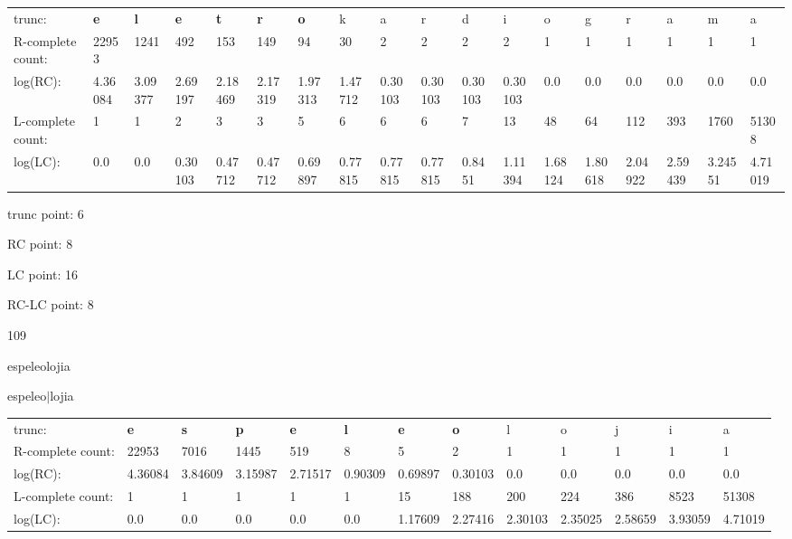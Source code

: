 \documentclass{article}
\begin{document}
\begin{tabular}{l|lllllllllllllllll}

trunc: & {\color{red}\bf e} & {\color{red}\bf l} & {\color{red}\bf e} & {\color{red}\bf t} & {\color{red}\bf r} & {\color{red}\bf o} & k & a & r & d & i & o & g & r & a & m & a \\ 
R-complete count: & 22953 & 1241 & 492 & 153 & 149 & 94 & 30 & 2 & 2 & 2 & 2 & 1 & 1 & 1 & 1 & 1 & 1 \\ 
log(RC): & 4.36084 & 3.09377 & 2.69197 & 2.18469 & 2.17319 & 1.97313 & 1.47712 & 0.30103 & 0.30103 & 0.30103 & 0.30103 & 0.0 & 0.0 & 0.0 & 0.0 & 0.0 & 0.0 \\ 
L-complete count: & 1 & 1 & 2 & 3 & 3 & 5 & 6 & 6 & 6 & 7 & 13 & 48 & 64 & 112 & 393 & 1760 & 51308 \\ 
log(LC): & 0.0 & 0.0 & 0.30103 & 0.47712 & 0.47712 & 0.69897 & 0.77815 & 0.77815 & 0.77815 & 0.8451 & 1.11394 & 1.68124 & 1.80618 & 2.04922 & 2.59439 & 3.24551 & 4.71019 \\ 
\end{tabular}

trunc point: 6

RC point: 8

LC point: 16

RC-LC point: 8

\vspace{3em}



109

espeleolojia

espeleo$|$lojia

\vspace{1em}

\begin{tabular}{l|llllllllllll}

trunc: & {\color{red}\bf e} & {\color{red}\bf s} & {\color{red}\bf p} & {\color{red}\bf e} & {\color{red}\bf l} & {\color{red}\bf e} & {\color{red}\bf o} & l & o & j & i & a \\ 
R-complete count: & 22953 & 7016 & 1445 & 519 & 8 & 5 & 2 & 1 & 1 & 1 & 1 & 1 \\ 
log(RC): & 4.36084 & 3.84609 & 3.15987 & 2.71517 & 0.90309 & 0.69897 & 0.30103 & 0.0 & 0.0 & 0.0 & 0.0 & 0.0 \\ 
L-complete count: & 1 & 1 & 1 & 1 & 1 & 15 & 188 & 200 & 224 & 386 & 8523 & 51308 \\ 
log(LC): & 0.0 & 0.0 & 0.0 & 0.0 & 0.0 & 1.17609 & 2.27416 & 2.30103 & 2.35025 & 2.58659 & 3.93059 & 4.71019 \\ 
\end{tabular}
\end{document}

